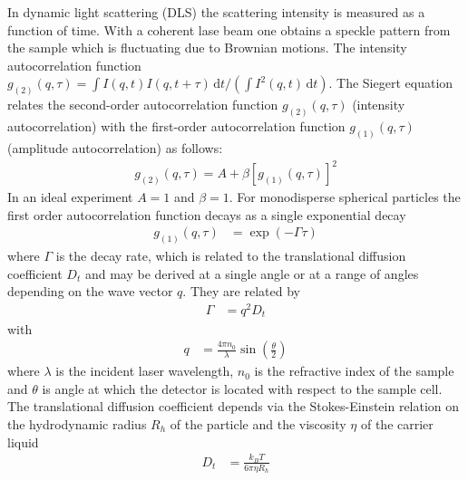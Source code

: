 In dynamic light scattering (DLS) the scattering intensity is measured as a function of time. With a coherent lase beam one obtains a speckle pattern from the sample which is fluctuating due to Brownian motions. The intensity autocorrelation function $g_{(2)}(q,\tau)=\int  I(q,t) I(q,t+\tau)\,\mathrm{d}t/\left(\int  I^2(q,t)\,\mathrm{d}t\right)$. The Siegert equation relates the second-order autocorrelation function $g_{(2)}(q,\tau)$ (intensity autocorrelation) with the first-order autocorrelation function $g_{(1)}(q,\tau)$ (amplitude autocorrelation) as follows:
\begin{align}
    \label{eq:siegert}
    g_{(2)}(q,\tau)= A+\beta\left[g_{(1)}(q,\tau)\right]^2
\end{align}
In an ideal experiment $A=1$ and $\beta=1$. For monodisperse spherical particles the first order autocorrelation function decays as a single exponential decay
\begin{align}
    g_{(1)}(q,\tau) &= \exp\left(-\Gamma\tau\right)
\end{align}
where $\Gamma$ is the decay rate, which is related to the translational diffusion coefficient $D_t$ and may be derived at a single angle or at a range of angles depending on the wave vector $q$. They are related by
\begin{align}\label{eq:GammaDq2}
\Gamma &=q^2D_t
\end{align}
with
\begin{align}
\label{eq:q}
 q &= \frac{4\pi n_0}{\lambda}\sin\left(\frac{\theta}{2}\right)
\end{align}
where $\lambda$ is the incident laser wavelength, $n_0$ is the refractive index of the sample and $\theta$ is angle at which the detector is located with respect to the sample cell. The translational diffusion coefficient depends via the Stokes-Einstein relation on the hydrodynamic radius $R_h$ of the particle and the viscosity $\eta$ of the carrier liquid
\begin{align}
\label{eq:D_t}
D_t &= \frac{k_BT}{6\pi\eta R_h}
\end{align}


